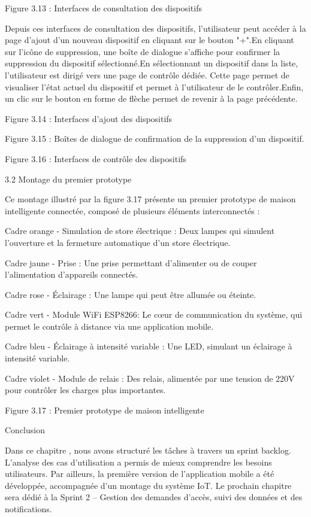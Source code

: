 \documentclass{article}
\begin{document}
Figure 3.13 : Interfaces de consultation des dispositifs

Depuis ces interfaces de consultation des dispositifs, l'utilisateur peut accéder à la page d'ajout d’un nouveau dispositif en cliquant sur le bouton "+".En cliquant sur l'icône de suppression, une boîte de dialogue s'affiche pour confirmer la suppression du dispositif sélectionné.En sélectionnant un dispositif dans la liste, l'utilisateur est dirigé vers une page de contrôle dédiée. Cette page permet de visualiser l’état actuel du dispositif et permet à l’utilisateur de le contrôler.Enfin, un clic sur le bouton en forme de flèche permet de revenir à la page précédente.

Figure 3.14 : Interfaces d’ajout des dispositifs

Figure 3.15 : Boîtes de dialogue de confirmation de la suppression d’un dispositif.

Figure 3.16 : Interfaces de contrôle des dispositifs

3.2 Montage du premier prototype

Ce montage illustré par la figure 3.17 présente un premier prototype de maison intelligente connectée, composé de plusieurs éléments interconnectés :

Cadre orange - Simulation de store électrique : Deux lampes qui simulent l'ouverture et la fermeture automatique d'un store électrique.

Cadre jaune - Prise  : Une prise permettant d'alimenter ou de couper l'alimentation d'appareils connectés.

Cadre rose - Éclairage : Une lampe qui peut être allumée ou éteinte.

Cadre vert - Module WiFi ESP8266: Le cœur de communication du système, qui permet le contrôle à distance via une application mobile.

Cadre bleu - Éclairage à intensité variable : Une LED, simulant un éclairage  à intensité variable.

Cadre violet - Module de relais : Des relais, alimentée par une tension de 220V pour contrôler les charges plus importantes.

Figure 3.17 : Premier prototype de maison intelligente

Conclusion

Dans ce chapitre , nous avons structuré les tâches à travers un sprint backlog. L’analyse des cas d’utilisation a permis de mieux comprendre les besoins utilisateurs. Par ailleurs, la première version de l’application mobile a été développée, accompagnée d’un montage du système IoT. Le prochain chapitre sera dédié à la  Sprint 2 – Gestion des demandes d’accès, suivi des données et des notifications.
\end{document}
